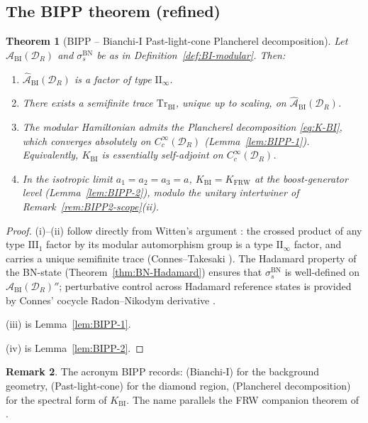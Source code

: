 \documentclass[11pt,a4paper]{article}
\newtheorem{theorem}{Theorem}[section]
\theoremstyle{definition}
\newtheorem{remark}[theorem]{Remark}
\newcommand{\cA}{\mathcal{A}}
\newcommand{\cD}{\mathcal{D}}
\newcommand{\Tr}{\mathrm{Tr}}
\newcommand{\BI}{\mathrm{BI}}
\newcommand{\FRW}{\mathrm{FRW}}
\newcommand{\BN}{\mathrm{BN}}
\begin{document}
\subsection{The BIPP theorem (refined)}

\begin{theorem}[BIPP -- Bianchi-I Past-light-cone Plancherel decomposition]
\label{thm:BIPP}
Let $\cA_\BI(\cD_R)$ and $\sigma_s^\BN$ be as in
Definition~\ref{def:BI-modular}. Then:
\begin{enumerate}\setlength\itemsep{2pt}
\item[(i)] $\widehat{\cA}_\BI(\cD_R)$ is a factor of type $\mathrm{II}_\infty$.
\item[(ii)] There exists a semifinite trace $\Tr_\BI$, unique up to scaling,
on $\widehat{\cA}_\BI(\cD_R)$.
\item[(iii)] The modular Hamiltonian admits the Plancherel decomposition
\eqref{eq:K-BI}, which converges absolutely on $C_c^\infty(\cD_R)$
(Lemma~\ref{lem:BIPP-1}). Equivalently, $K_\BI$ is essentially
self-adjoint on $C_c^\infty(\cD_R)$.
\item[(iv)] In the isotropic limit $a_1=a_2=a_3=a$, $K_\BI = K_\FRW$ at
the boost-generator level (Lemma~\ref{lem:BIPP-2}), modulo the unitary
intertwiner of Remark~\ref{rem:BIPP2-scope}(ii).
\end{enumerate}
\end{theorem}

\begin{proof}
(i)--(ii) follow directly from Witten's argument \cite[\S 3]{Witten2022}:
the crossed product of any type $\mathrm{III}_1$ factor by its modular
automorphism group is a type $\mathrm{II}_\infty$ factor, and carries a
unique semifinite trace (Connes--Takesaki \cite{Connes73}). The
Hadamard property of the BN-state (Theorem~\ref{thm:BN-Hadamard}) ensures
that $\sigma_s^\BN$ is well-defined on $\cA_\BI(\cD_R)''$; perturbative
control across Hadamard reference states is provided by Connes' cocycle
Radon--Nikodym derivative \cite{Connes73}.

(iii) is Lemma~\ref{lem:BIPP-1}.

(iv) is Lemma~\ref{lem:BIPP-2}.
\end{proof}

\begin{remark}\label{rem:BIPP-name}
The acronym BIPP records: (Bianchi-I) for the background geometry,
(Past-light-cone) for the diamond region, (Plancherel decomposition)
for the spectral form of $K_\BI$. The name parallels the FRW companion
theorem of \cite{ECI-FRW-note}.
\end{remark}
\end{document}
